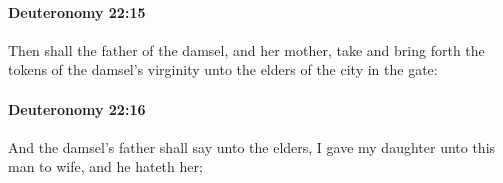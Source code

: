		\paragraph{Deuteronomy 22:15} %
			\label{DEUTERONOMY-22-15}

			Then shall the father of the damsel, and her mother, take and bring forth the tokens of the damsel's virginity unto the elders of the city in the gate:


		\paragraph{Deuteronomy 22:16} %
			\label{DEUTERONOMY-22-16}

			And the damsel's father shall say unto the elders, I gave my daughter unto this man to wife, and he hateth her;



